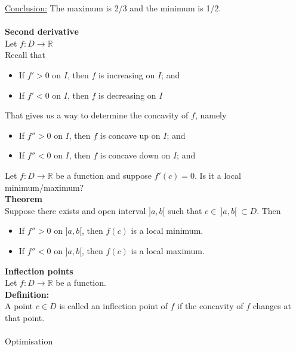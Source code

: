 \documentclass[]{article}
\begin{document}
	\underline{Conclusion:} The maximum is 2/3 and the minimum is 1/2.\\\\
	\large{\bf Second derivative}\\
	\normalsize
	Let $f:D\rightarrow\mathbb{R}$\\
	Recall that
	\begin{itemize}
		\item If $f'>0$ on $I$, then $f$ is increasing on $I$; and
		\item If $f'<0$ on $I$, then $f$ is decreasing on $I$
	\end{itemize}
	That gives us a way to determine the concavity of $f$, namely
	\begin{itemize}
		\item If $f''>0$ on $I$, then $f$ is concave up on $I$; and
		\item If $f''<0$ on $I$, then $f$ is concave down on $I$; and
	\end{itemize}
	Let $f:D\rightarrow\mathbb{R}$ be a function and suppose $f'(c)=0$. Is it a local minimum/maximum?\\
	{\bf Theorem}\\
	Suppose there exists and open interval $]a,b[$ such that $c\in~]a,b[~\subset D$. Then
	\begin{itemize}
		\item If $f''>0$ on $]a,b[$, then $f(c)$ is a local minimum.
		\item If $f''<0$ on $]a,b[$, then $f(c)$ is a local maximum.
	\end{itemize}
	\large{\bf Inflection points}\\
	\normalsize
	Let $f:D\rightarrow\mathbb{R}$ be a function.\\
	{\bf Definition:}\\
	A point $c\in D$ is called an inflection point of $f$ if the concavity of $f$ changes at that point.\\\\
	\Large{Optimisation}
	\normalsize
\end{document}
